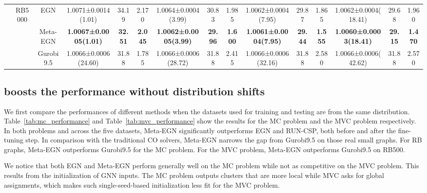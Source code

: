 \begin{table}[t]
{\begin{tabular}{@{}ccc|ccc|ccc|ccc|ccc@{}}
&\multirow{3}{*}{RB5000} & EGN & 1.0071±0.0014(1.01) & 34.19 & 2.170 & 1.0064±0.0004(3.99) & 30.83 & 1.985 & 1.0062±0.0004(7.95) & 29.87 & 1.865 & 1.0062±0.0004(18.41) & 29.68 & 1.960 \\
& & Meta-EGN & \textbf{1.0067±0.0005(1.01)} & \textbf{32.51} & \textbf{2.045} & \textbf{1.0062±0.0005(3.99)} & \textbf{29.96} & \textbf{1.600} & \textbf{1.0061±0.0004(7.95)} & \textbf{29.44} & \textbf{1.555} & \textbf{1.0060±0.0003(18.41)} & \textbf{29.15} & \textbf{1.470} \\
& & Gurobi9.5 & 1.0066±0.0006(24.60) & 31.88 & 1.785 & 1.0066±0.0006(28.72) & 31.88 & 2.415 & 1.0066±0.0006(32.16) & 31.88 & 2.580 & 1.0066±0.0006(42.62) & 31.88 & 2.570 \\ \bottomrule
\end{tabular}}
    \vspace{-3mm}
\end{table}

\subsection{\proj boosts the performance without distribution shifts}\label{sec:in-dis}

We first compare the performances of different methods when the datasets used for training and testing are from the same distribution. Table~\ref{tab:mc_performance} and Table~\ref{tab:mvc_performance} show the results for the MC problem and the MVC problem respectively. 
In both problems and across the five datasets, Meta-EGN significantly outperforms EGN and RUN-CSP, both before and after the fine-tuning step. In comparison with the traditional CO solvers, Meta-EGN narrows the gap from Gurobi9.5 on those real small graphs. For RB graphs, Meta-EGN outperforms Gurobi9.5 for the MC problem. For the MVC problem, Meta-EGN outperforms Gurobi9.5 on RB500. 

We notice that both EGN and Meta-EGN perform generally well on the MC problem while not as competitive on the MVC problem. This results from the initialization of GNN inputs. The MC problem outputs clusters that are more local while MVC asks for global assignments, which makes such single-seed-based initialization less fit for the MVC problem. %


